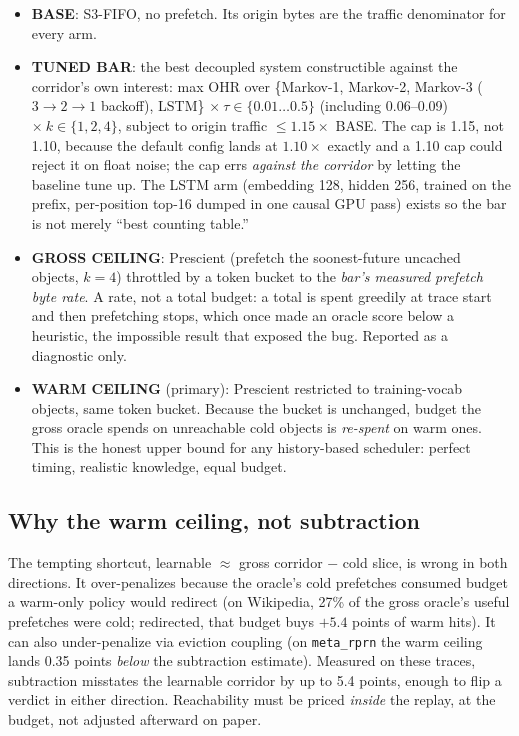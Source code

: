 \documentclass[11pt]{article}
\begin{document}
\begin{itemize}\itemsep0.1em
\item \textbf{BASE}: S3-FIFO, no prefetch. Its origin bytes are the traffic denominator for every arm.
\item \textbf{TUNED BAR}: the best decoupled system constructible against the corridor's own interest: max OHR over \{Markov-1, Markov-2, Markov-3 ($3{\to}2{\to}1$ backoff), LSTM\} $\times\ \tau \in \{0.01\ldots0.5\}$ (including 0.06--0.09) $\times\ k \in \{1,2,4\}$, subject to origin traffic $\leq 1.15\times$ BASE. The cap is 1.15, not 1.10, because the default config lands at $1.10\times$ exactly and a 1.10 cap could reject it on float noise; the cap errs \emph{against the corridor} by letting the baseline tune up. The LSTM arm (embedding 128, hidden 256, trained on the prefix, per-position top-16 dumped in one causal GPU pass) exists so the bar is not merely ``best counting table.''
\item \textbf{GROSS CEILING}: Prescient (prefetch the soonest-future uncached objects, $k{=}4$) throttled by a token bucket to the \emph{bar's measured prefetch byte rate}. A rate, not a total budget: a total is spent greedily at trace start and then prefetching stops, which once made an oracle score below a heuristic, the impossible result that exposed the bug. Reported as a diagnostic only.
\item \textbf{WARM CEILING} (primary): Prescient restricted to training-vocab objects, same token bucket. Because the bucket is unchanged, budget the gross oracle spends on unreachable cold objects is \emph{re-spent} on warm ones. This is the honest upper bound for any history-based scheduler: perfect timing, realistic knowledge, equal budget.
\end{itemize}

\subsection{Why the warm ceiling, not subtraction}\label{sec:whywarm}
The tempting shortcut, learnable $\approx$ gross corridor $-$ cold slice, is wrong in both directions. It over-penalizes because the oracle's cold prefetches consumed budget a warm-only policy would redirect (on Wikipedia, 27\% of the gross oracle's useful prefetches were cold; redirected, that budget buys $+5.4$ points of warm hits). It can also under-penalize via eviction coupling (on \texttt{meta\_rprn} the warm ceiling lands 0.35 points \emph{below} the subtraction estimate). Measured on these traces, subtraction misstates the learnable corridor by up to 5.4 points, enough to flip a verdict in either direction. Reachability must be priced \emph{inside} the replay, at the budget, not adjusted afterward on paper.
\end{document}
